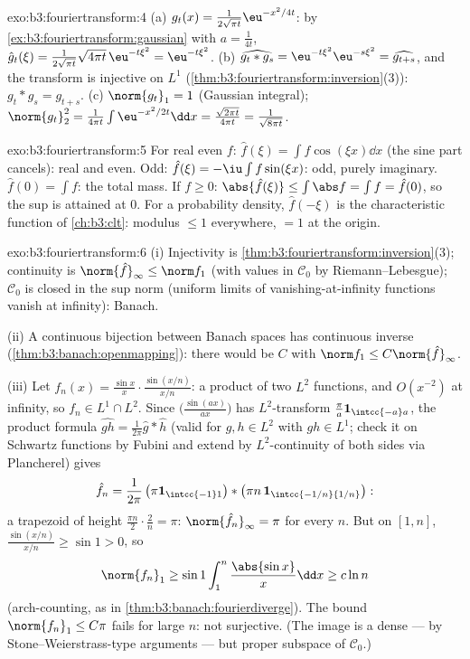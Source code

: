 \begin{solution}{exo:b3:fouriertransform:4}
(a) $g_t(x) = \frac1{2\sqrt{\pi t}}\eu^{-x^2/4t}$: by
\cref{ex:b3:fouriertransform:gaussian} with $a = \frac1{4t}$,
$\hat g_t(\xi) = \frac1{2\sqrt{\pi t}}\sqrt{4\pi
t}\,\eu^{-t\xi^2} = \eu^{-t\xi^2}$.
(b) $\widehat{g_t * g_s} = \eu^{-t\xi^2}\eu^{-s\xi^2} =
\widehat{g_{t+s}}$, and the transform is injective on $L^1$
(\cref{thm:b3:fouriertransform:inversion}(3)): $g_t * g_s =
g_{t+s}$.
(c) $\norm{g_t}_1 = 1$ (Gaussian integral);
$\norm{g_t}_2^2 = \frac1{4\pi t}\int\eu^{-x^2/2t}\dd x =
\frac{\sqrt{2\pi t}}{4\pi t} = \frac1{\sqrt{8\pi t}}$.
\end{solution}

\begin{solution}{exo:b3:fouriertransform:5}
For real even $f$: $\hat f(\xi) = \int f\cos(\xi x)\dd x$ (the
sine part cancels): real and even. Odd: $\hat f(\xi) =
-\iu\int f\sin(\xi x)$: odd, purely imaginary. $\hat f(0) =
\int f$: the total mass. If $f \geq 0$: $\abs{\hat f(\xi)}
\leq \int\abs f = \int f = \hat f(0)$, so the sup is attained
at $0$. For a probability density, $\hat f(-\xi)$ is the
characteristic function of \cref{ch:b3:clt}: modulus $\leq 1$
everywhere, $= 1$ at the origin.
\end{solution}

\begin{solution}{exo:b3:fouriertransform:6}
(i) Injectivity is
\cref{thm:b3:fouriertransform:inversion}(3); continuity is
$\norm{\hat f}_\infty \leq \norm f_1$ (with values in
$\mathcal C_0$ by Riemann--Lebesgue); $\mathcal C_0$ is closed
in the sup norm (uniform limits of vanishing-at-infinity
functions vanish at infinity): Banach.

(ii) A continuous bijection between Banach spaces has
continuous inverse (\cref{thm:b3:banach:openmapping}): there
would be $C$ with $\norm f_1 \leq C\norm{\hat f}_\infty$.

(iii) Let $f_n(x) = \frac{\sin x}x\cdot\frac{\sin(x/n)}{x/n}$:
a product of two $L^2$ functions, and $O(x^{-2})$ at
infinity, so $f_n \in L^1\cap L^2$. Since
$\bigl(\frac{\sin(ax)}{ax}\bigr)$ has $L^2$-transform
$\frac\pi a\mathbf 1_{\intcc{-a}a}$, the product formula
$\widehat{gh} = \frac1{2\pi}\hat g * \hat h$ (valid for $g, h
\in L^2$ with $gh \in L^1$; check it on Schwartz functions by
Fubini and extend by $L^2$-continuity of both sides via
Plancherel) gives
\[
\hat f_n = \frac1{2\pi}\,\bigl(\pi\mathbf
1_{\intcc{-1}1}\bigr) * \bigl(\pi n\,\mathbf
1_{\intcc{-1/n}{1/n}}\bigr):
\]
a trapezoid of height $\frac{\pi n}2\cdot\frac2n = \pi$:
$\norm{\hat f_n}_\infty = \pi$ for every $n$. But on $[1,
n]$, $\frac{\sin(x/n)}{x/n} \geq \sin 1 > 0$, so
\[
\norm{f_n}_1 \geq \sin 1\int_1^n\frac{\abs{\sin x}}x\dd x
\geq c\ln n
\]
(arch-counting, as in \cref{thm:b3:banach:fourierdiverge}).
The bound $\norm{f_n}_1 \leq C\pi$ fails for large $n$: not
surjective. (The image is a dense --- by
Stone--Weierstrass-type arguments --- but proper subspace of
$\mathcal C_0$.)
\end{solution}

